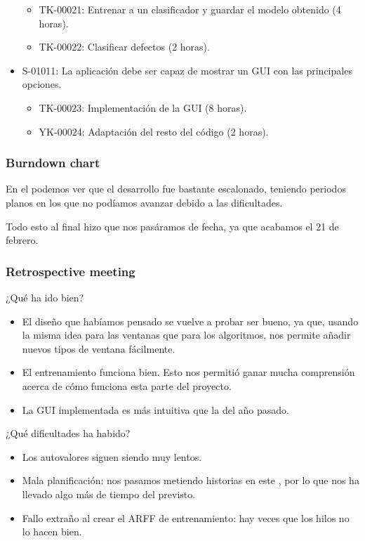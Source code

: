 \begin{itemize}
\begin{itemize}
  \item TK-00021: Entrenar a un clasificador y guardar el modelo obtenido (4 horas).
  \item TK-00022: Clasificar defectos (2 horas).
 \end{itemize}
 \item S-01011: La aplicación debe ser capaz de mostrar un GUI con las principales opciones.
 \begin{itemize}
  \item TK-00023: Implementación de la GUI (8 horas).
  \item YK-00024: Adaptación del resto del código (2 horas).
 \end{itemize}
\end{itemize}

\subsubsection*{Burndown chart}
En el \burndownchart{}  podemos ver que el desarrollo fue bastante escalonado, teniendo periodos planos en los que no podíamos avanzar debido a las dificultades.


Todo esto al final hizo que nos pasáramos de fecha, ya que acabamos el 21 de febrero.


\subsubsection*{Retrospective meeting}
¿Qué ha ido bien?
\begin{itemize}
 \item El diseño que habíamos pensado se vuelve a probar ser bueno, ya que, usando la misma idea para las ventanas que para los algoritmos, nos permite añadir nuevos tipos de ventana fácilmente.
 \item El entrenamiento funciona bien. Esto nos permitió ganar mucha comprensión acerca de cómo funciona esta parte del proyecto.
 \item La GUI implementada es más intuitiva que la del año pasado.
\end{itemize}

¿Qué dificultades ha habido?
\begin{itemize}
 \item Los autovalores siguen siendo muy lentos.
 \item Mala planificación: nos pasamos metiendo historias en este \sprint{}, por lo que nos ha llevado algo más de tiempo del previsto.
 \item Fallo extraño al crear el ARFF de entrenamiento: hay veces que los hilos no lo hacen bien.
\end{itemize}